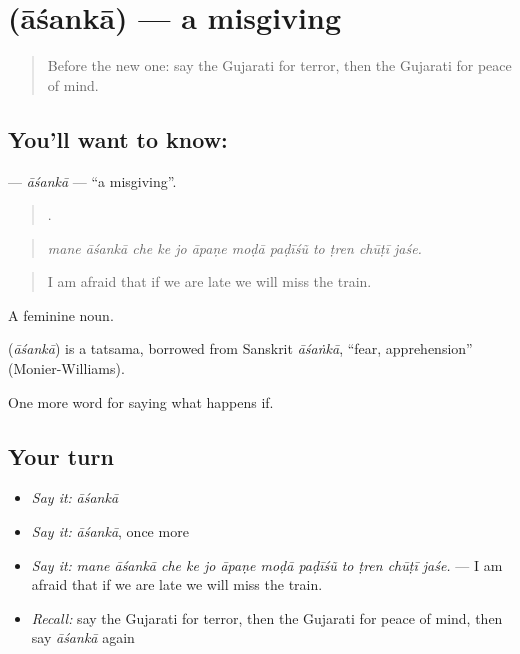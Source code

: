 \section[\texorpdfstring{\gu{આશંકા} (āśankā)}{આશંકા (āśankā)}]{ (āśankā) — a misgiving}

\label{lesson:GU-C369-asanka}



\begin{quote}
Before the new one: say the Gujarati for terror, then the Gujarati for peace of mind.
\end{quote}

\subsection*{You'll want to know: }
\textbf{} — \emph{āśankā} — \textquotedblleft{}a misgiving\textquotedblright{}.

\begin{quote}
           .
\end{quote}

\begin{quote}
\emph{mane āśankā che ke jo āpaṇe moḍā paḍīśũ to ṭren chūṭī jaśe.}
\end{quote}

\begin{quote}
I am afraid that if we are late we will miss the train.
\end{quote}

A feminine noun.

\begin{cousinweb}
\textbf{} (\emph{āśankā}) is a tatsama, borrowed from Sanskrit \emph{āśaṅkā}, \textquotedblleft{}fear, apprehension\textquotedblright{} (Monier-Williams).
\end{cousinweb}

\begin{grammarlens}[title={What you've built}]
One more word for saying what happens if.
\end{grammarlens}

\subsection*{Your turn}
\begin{itemize}
\raggedright
  \item \emph{Say it:} \emph{āśankā}
  \item \emph{Say it:} \emph{āśankā}, once more
  \item \emph{Say it:} \emph{mane āśankā che ke jo āpaṇe moḍā paḍīśũ to ṭren chūṭī jaśe.} — I am afraid that if we are late we will miss the train.
  \item \emph{Recall:} say the Gujarati for terror, then the Gujarati for peace of mind, then say \emph{āśankā} again
\end{itemize}

